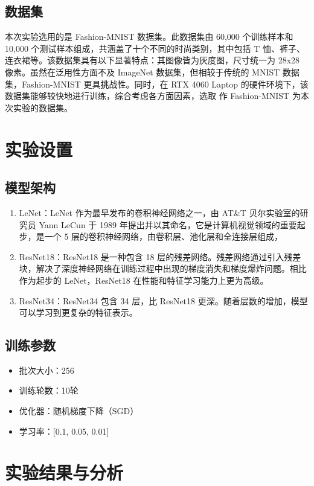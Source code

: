 \documentclass[UTF8]{ctexart}
\begin{document}
\subsection{数据集}
本次实验选用的是 Fashion-MNIST 数据集。此数据集由 60,000 个训练样本和 10,000 个测试样本组成，共涵盖了十个不同的时尚类别，其中包括 T 恤、裤子、连衣裙等。该数据集具有以下显著特点：其图像皆为灰度图，尺寸统一为 28x28 像素。虽然在泛用性方面不及 ImageNet 数据集，但相较于传统的 MNIST 数据集，Fashion-MNIST 更具挑战性。同时，在 RTX 4060 Laptop 的硬件环境下，该数据集能够较快地进行训练，综合考虑各方面因素，选取 作 Fashion-MNIST 为本次实验的数据集。

\section{实验设置}
\subsection{模型架构}
\begin{enumerate}
    \item LeNet：LeNet 作为最早发布的卷积神经网络之一，由 AT\&T 贝尔实验室的研究员 Yann LeCun 于 1989 年提出并以其命名，它是计算机视觉领域的重要起步，是一个 5 层的卷积神经网络，由卷积层、池化层和全连接层组成，
    \item ResNet18：ResNet18 是一种包含 18 层的残差网络。残差网络通过引入残差块，解决了深度神经网络在训练过程中出现的梯度消失和梯度爆炸问题。相比作为起步的 LeNet，ResNet18 在性能和特征学习能力上更为高级。
    \item ResNet34：ResNet34 包含 34 层，比 ResNet18 更深。随着层数的增加，模型可以学习到更复杂的特征表示。
\end{enumerate}

\subsection{训练参数}
\begin{itemize}
    \item 批次大小：256
    \item 训练轮数：10轮
    \item 优化器：随机梯度下降（SGD）
    \item 学习率：[0.1, 0.05, 0.01]
\end{itemize}

\section{实验结果与分析}
\end{document}

